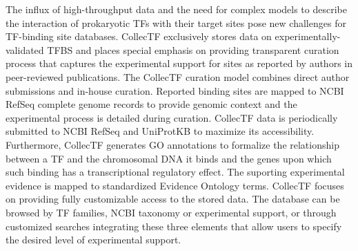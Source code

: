 The influx of high-throughput data and the need for complex models to describe
the interaction of prokaryotic TFs with their target sites pose new challenges
for TF-binding site databases. CollecTF exclusively stores data on
experimentally-validated TFBS and places special emphasis on providing
transparent curation process that captures the experimental support for sites
as reported by authors in peer-reviewed publications. The CollecTF curation
model combines direct author submissions and in-house curation. Reported
binding sites are mapped to NCBI RefSeq complete genome records to provide
genomic context and the experimental process is detailed during
curation. CollecTF data is periodically submitted to NCBI RefSeq and UniProtKB
to maximize its accessibility. Furthermore, CollecTF generates GO annotations
to formalize the relationship between a TF and the chromosomal DNA it binds and
the genes upon which such binding has a transcriptional regulatory effect. The
suporting experimental evidence is mapped to standardized Evidence Ontology
terms. CollecTF focuses on providing fully customizable access to the stored
data. The database can be browsed by TF families, NCBI
taxonomy or experimental support, or through customized searches integrating
these three elements that allow users to specify the desired level of
experimental support.
